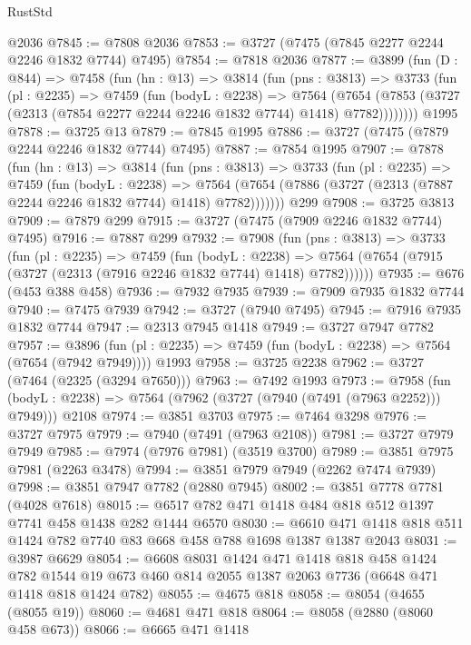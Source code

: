 \begin{lexlean}{RustStd}
\begin{coremodule}
    @2036
@7845 := @7808 @2036
@7853 := @3727 (@7475 (@7845 @2277 @2244 @2246 @1832 @7744) @7495)
@7854 := @7818 @2036
@7877 := @3899
    (fun (D : @844) =>
    @7458
      (fun (hn : @13) =>
      @3814
        (fun (pns : @3813) =>
        @3733
          (fun (pl : @2235) =>
          @7459
            (fun (bodyL : @2238) =>
            @7564
              (@7654 (@7853 (@3727 (@2313 (@7854 @2277 @2244 @2246 @1832 @7744) @1418) @7782))))))))
    @1995
@7878 := @3725 @13
@7879 := @7845 @1995
@7886 := @3727 (@7475 (@7879 @2244 @2246 @1832 @7744) @7495)
@7887 := @7854 @1995
@7907 := @7878
    (fun (hn : @13) =>
    @3814
      (fun (pns : @3813) =>
      @3733
        (fun (pl : @2235) =>
        @7459
          (fun (bodyL : @2238) =>
          @7564 (@7654 (@7886 (@3727 (@2313 (@7887 @2244 @2246 @1832 @7744) @1418) @7782)))))))
    @299
@7908 := @3725 @3813
@7909 := @7879 @299
@7915 := @3727 (@7475 (@7909 @2246 @1832 @7744) @7495)
@7916 := @7887 @299
@7932 := @7908
    (fun (pns : @3813) =>
    @3733
      (fun (pl : @2235) =>
      @7459
        (fun (bodyL : @2238) =>
        @7564 (@7654 (@7915 (@3727 (@2313 (@7916 @2246 @1832 @7744) @1418) @7782))))))
@7935 := @676 (@453 @388 @458)
@7936 := @7932 @7935
@7939 := @7909 @7935 @1832 @7744
@7940 := @7475 @7939
@7942 := @3727 (@7940 @7495)
@7945 := @7916 @7935 @1832 @7744
@7947 := @2313 @7945 @1418
@7949 := @3727 @7947 @7782
@7957 := @3896
    (fun (pl : @2235) => @7459 (fun (bodyL : @2238) => @7564 (@7654 (@7942 @7949))))
    @1993
@7958 := @3725 @2238
@7962 := @3727 (@7464 (@2325 (@3294 @7650)))
@7963 := @7492 @1993
@7973 := @7958
    (fun (bodyL : @2238) => @7564 (@7962 (@3727 (@7940 (@7491 (@7963 @2252))) @7949)))
    @2108
@7974 := @3851 @3703
@7975 := @7464 @3298
@7976 := @3727 @7975
@7979 := @7940 (@7491 (@7963 @2108))
@7981 := @3727 @7979 @7949
@7985 := @7974 (@7976 @7981) (@3519 @3700)
@7989 := @3851 @7975 @7981 (@2263 @3478)
@7994 := @3851 @7979 @7949 (@2262 @7474 @7939)
@7998 := @3851 @7947 @7782 (@2880 @7945)
@8002 := @3851 @7778 @7781 (@4028 @7618)
@8015 := @6517 @782 @471 @1418 @484 @818 @512 @1397 @7741 @458 @1438 @282 @1444 @6570
@8030 := @6610 @471 @1418 @818 @511 @1424 @782 @7740 @83 @668 @458 @788 @1698 @1387 @1387 @2043
@8031 := @3987 @6629
@8054 := @6608
    @8031
    @1424
    @471
    @1418
    @818
    @458
    @1424
    @782
    @1544
    @19
    @673
    @460
    @814
    @2055
    @1387
    @2063
    @7736
    (@6648 @471 @1418 @818 @1424 @782)
@8055 := @4675 @818
@8058 := @8054 (@4655 (@8055 @19))
@8060 := @4681 @471 @818
@8064 := @8058 (@2880 (@8060 @458 @673))
@8066 := @6665 @471 @1418

\end{coremodule}
\end{lexlean}
